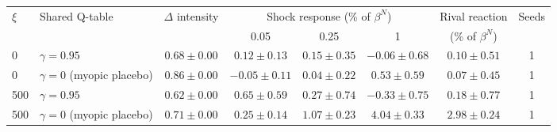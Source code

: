 \begin{tabular}{llcccccc}
\toprule
$\xi$ & Shared Q-table & $\Delta$ intensity & \multicolumn{3}{c}{Shock response (\% of $\beta^N$)} & Rival reaction & Seeds \\
 & & & 0.05 & 0.25 & 1 & (\% of $\beta^N$) & \\
\midrule
0 & $\gamma=0.95$ & $0.68 \pm 0.00$ & $0.12 \pm 0.13$ & $0.15 \pm 0.35$ & $-0.06 \pm 0.68$ & $0.10 \pm 0.51$ & 1 \\
0 & $\gamma=0$ (myopic placebo) & $0.86 \pm 0.00$ & $-0.05 \pm 0.11$ & $0.04 \pm 0.22$ & $0.53 \pm 0.59$ & $0.07 \pm 0.45$ & 1 \\
500 & $\gamma=0.95$ & $0.62 \pm 0.00$ & $0.65 \pm 0.59$ & $0.27 \pm 0.74$ & $-0.33 \pm 0.75$ & $0.18 \pm 0.77$ & 1 \\
500 & $\gamma=0$ (myopic placebo) & $0.71 \pm 0.00$ & $0.25 \pm 0.14$ & $1.07 \pm 0.23$ & $4.04 \pm 0.33$ & $2.98 \pm 0.24$ & 1 \\
\bottomrule
\end{tabular}